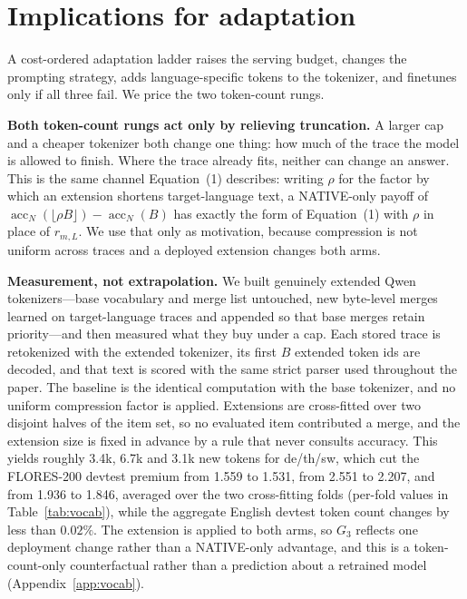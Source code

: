 \documentclass[11pt]{article}
\begin{document}
\section{Implications for adaptation}
\label{sec:ladder}

A cost-ordered adaptation ladder raises the serving budget, changes the
prompting strategy, adds language-specific tokens to the tokenizer, and
finetunes only if all three fail. We price the two token-count rungs.

\textbf{Both token-count rungs act only by relieving truncation.} A larger cap
and a cheaper tokenizer both change one thing: how much of the trace the model
is allowed to finish. Where the trace already fits, neither can change an
answer. This is the same channel Equation~(1) describes: writing \(\rho\) for
the factor by which an extension shortens target-language text, a NATIVE-only
payoff of \(\operatorname{acc}_N(\lfloor\rho B\rfloor)-\operatorname{acc}_N(B)\)
has exactly the form of Equation~(1) with \(\rho\) in place of \(r_{m,L}\). We
use that only as motivation, because compression is not uniform across traces
and a deployed extension changes both arms.

\textbf{Measurement, not extrapolation.} We built genuinely extended Qwen
tokenizers---base vocabulary and merge list untouched, new byte-level merges
learned on target-language traces and appended so that base merges retain
priority---and then measured what they buy under a cap. Each stored trace is
retokenized with the extended tokenizer, its first \(B\) extended token ids are
decoded, and that text is scored with the same strict parser used throughout
the paper. The baseline is the identical computation with the base tokenizer,
and no uniform compression factor is applied. Extensions are cross-fitted over
two disjoint halves of the item set, so no evaluated item contributed a merge,
and the extension size is fixed in advance by a rule that never consults
accuracy. This yields roughly
3.4k, 6.7k and 3.1k new tokens for de/th/sw, which cut the FLORES-200 devtest
premium from 1.559 to 1.531, from 2.551 to 2.207, and from 1.936 to 1.846,
averaged over the two cross-fitting folds (per-fold values in
Table~\ref{tab:vocab}), while the aggregate English devtest token count changes
by less than \(0.02\%\). The extension is applied to both arms, so \(G_3\) reflects one
deployment change rather than a NATIVE-only advantage, and this is a
token-count-only counterfactual rather than a prediction about a retrained
model (Appendix~\ref{app:vocab}).
\end{document}
